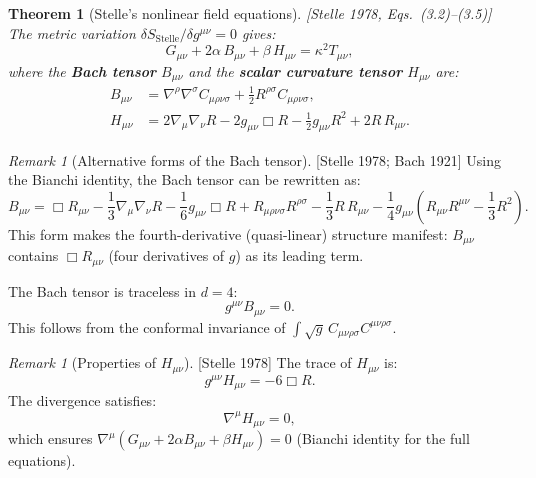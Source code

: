 \documentclass[12pt,a4paper]{article}
\newtheorem{theorem}[proposition]{Theorem}
\theoremstyle{definition}
\theoremstyle{remark}
\newtheorem{remark}[proposition]{Remark}
\newcommand{\Ricsq}{R_{\mu\nu}R^{\mu\nu}}
\newcommand{\Weylsq}{C_{\mu\nu\rho\sigma}C^{\mu\nu\rho\sigma}}
\newcommand{\fromlit}[1]{\textcolor{blue!70!black}{\textsf{[#1]}}}
\begin{document}
\begin{theorem}[Stelle's nonlinear field equations]
\label{thm:stelle-eom}
\fromlit{Stelle 1978, Eqs.~(3.2)--(3.5)}
The metric variation $\delta S_{\mathrm{Stelle}}/\delta g^{\mu\nu} = 0$
gives:
\begin{equation}\label{eq:stelle-eom}
  \boxed{
    G_{\mu\nu} + 2\alpha\,B_{\mu\nu} + \beta\,H_{\mu\nu}
    = \kappa^2 T_{\mu\nu},
  }
\end{equation}
where the \textbf{Bach tensor} $B_{\mu\nu}$ and the
\textbf{scalar curvature tensor} $H_{\mu\nu}$ are:
\begin{align}
  B_{\mu\nu} &= \nabla^\rho\nabla^\sigma C_{\mu\rho\nu\sigma}
    + \frac{1}{2}R^{\rho\sigma}C_{\mu\rho\nu\sigma},
  \label{eq:bach}\\[6pt]
  H_{\mu\nu} &= 2\nabla_\mu\nabla_\nu R - 2g_{\mu\nu}\Box R
    - \frac{1}{2}g_{\mu\nu}R^2 + 2R\,R_{\mu\nu}.
  \label{eq:H-tensor}
\end{align}
\end{theorem}

\begin{remark}[Alternative forms of the Bach tensor]
\label{rem:bach-alt}
\fromlit{Stelle 1978; Bach 1921}
Using the Bianchi identity, the Bach tensor can be rewritten as:
\begin{equation}\label{eq:bach-alt}
  B_{\mu\nu} = \Box R_{\mu\nu} - \frac{1}{3}\nabla_\mu\nabla_\nu R
    - \frac{1}{6}g_{\mu\nu}\Box R
    + R_{\mu\rho\nu\sigma}R^{\rho\sigma}
    - \frac{1}{3}R\,R_{\mu\nu}
    - \frac{1}{4}g_{\mu\nu}\left(\Ricsq - \frac{1}{3}R^2\right).
\end{equation}
This form makes the fourth-derivative (quasi-linear) structure manifest:
$B_{\mu\nu}$ contains $\Box R_{\mu\nu}$ (four derivatives of $g$) as
its leading term.

The Bach tensor is traceless in $d = 4$:
\begin{equation}\label{eq:bach-trace}
  g^{\mu\nu}B_{\mu\nu} = 0.
\end{equation}
This follows from the conformal invariance of $\int\sqrt{g}\,\Weylsq$.
\end{remark}

\begin{remark}[Properties of $H_{\mu\nu}$]
\label{rem:H-props}
\fromlit{Stelle 1978}
The trace of $H_{\mu\nu}$ is:
\begin{equation}\label{eq:H-trace}
  g^{\mu\nu}H_{\mu\nu} = -6\Box R.
\end{equation}
The divergence satisfies:
\begin{equation}\label{eq:H-div}
  \nabla^\mu H_{\mu\nu} = 0,
\end{equation}
which ensures $\nabla^\mu(G_{\mu\nu} + 2\alpha B_{\mu\nu}
+ \beta H_{\mu\nu}) = 0$ (Bianchi identity for the full equations).
\end{remark}
\end{document}
